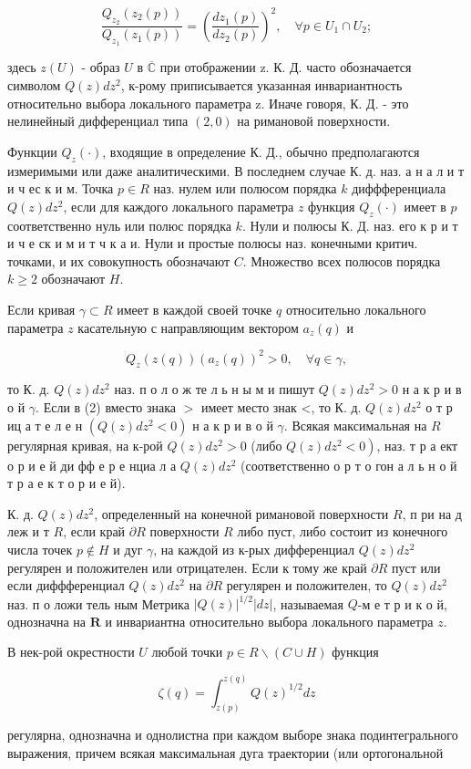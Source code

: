 \documentclass[10pt]{article}
\begin{document}
\[

\frac{Q_{z_{2}}\left(z_{2}(p)\right)}{Q_{z_{1}}\left(z_{1}(p)\right)}=\left(\frac{d z_{1}(p)}{d z_{2}(p)}\right)^{2}, \quad \forall p \in U_{1} \cap U_{2} ;

\]



здесь $z(U)$ - образ $U$ в $\overline{\mathbb{C}}$ при отображении z. К. Д. часто обозначается символом $Q(z) d z^{2}$, к-рому приписывается указанная инвариантность относительно выбора локального параметра z. Иначе говоря, К. Д. - это нелинейный дифференциал типа $(2,0)$ на римановой поверхности.



Функции $Q_{z}(\cdot)$, входящие в определение К. Д., обычно предполагаются измеримыми или даже аналитическими. В последнем случае К. д. наз. а н а л и т и ч ес к и м. Точка $p \in R$ наз. нулем или полюсом порядка $k$ диффференциала $Q(z) d z^{2}$, если для каждого локального параметра $z$ функция $Q_{z}(\cdot)$ имеет в $p$ соответственно нуль или полюс порядка $k$. Нули и полюсы $К$. Д. наз. его к р и т и ч е ск и м и т ч к а и. Нули и простые полюсы наз. конечными критич. точками, и их совокупность обозначают $C$. Множество всех полюсов порядка $k \geqslant 2$ обозначают $H$.



Если кривая $\gamma \subset R$ имеет в каждой своей точке $q$ относительно локального параметра $z$ касательную с направляющим вектором $a_{z}(q)$ и



\[

Q_{z}(z(q))\left(a_{z}(q)\right)^{2}>0, \quad \forall q \in \gamma,

\]



то К. д. $Q(z) d z^{2}$ наз. п о л о ж те л ь н ы м и пишут $Q(z) d z^{2}>0$ н а к р и в о й $\gamma$. Если в (2) вместо знака $>$ имеет место знак <, то К. д. $Q(z) d z^{2}$ о т р иц а т е л е н $\left(Q(z) d z^{2}<0\right)$ н а к р и в о й $\gamma$. Всякая максимальная на $R$ регулярная кривая, на к-рой $Q(z) d z^{2}>0$ (либо $\left.Q(z) d z^{2}<0\right)$, наз. т р а ект о р и е й ди фф е р е нциа л а $Q(z) d z^{2}$ (соответственно о р т о гон а л ь н о й т р а е к т о р и е й).



К. д. $Q(z) d z^{2}$, определенный на конечной римановой поверхности $R$, п ри на д леж и т $R$, если край $\partial R$ поверхности $R$ либо пуст, либо состоит из конечного числа точек $p \notin H$ и дуг $\gamma$, на каждой из к-рых дифференциал $Q(z) d z^{2}$ регулярен и положителен или отрицателен. Если к тому же край $\partial R$ пуст или если диффференциал $Q(z) d z^{2}$ на $\partial R$ регулярен и положителен, то $Q(z) d z^{2}$ наз. п о ложи тель ным Метрика $|Q(z)|^{1 / 2}|d z|$, называемая $Q$-м е т р и к о й, однозначна на $\boldsymbol{R}$ и инвариантна относительно выбора локального параметра $z$.



В нек-рой окрестности $U$ любой точки $p \in R \backslash(C \cup H)$ функция



\[

\zeta(q)=\int_{z(p)}^{z(q)} Q(z)^{1 / 2} d z

\]



регулярна, однозначна и однолистна при каждом выборе знака подинтегрального выражения, причем всякая максимальная дуга траектории (или ортогональной
\end{document}

